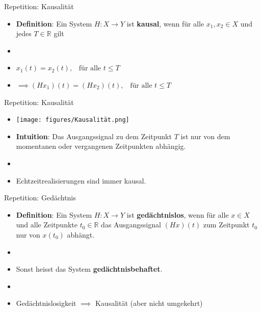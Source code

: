 \documentclass[14pt, aspectratio=169, handout]{beamer}
\begin{document}
\begin{frame}{Repetition: Kausalität}
    \begin{itemize}
        \item \textbf{Definition}: Ein System $H:X \to Y$ ist \textbf{kausal}, wenn für alle $x_1, x_2 \in X$ und jedes $T\in \mathbb{R}$ gilt
        \item[] 
        \item[] $x_1(t) = x_2(t), \hspace{10pt} \text{für alle } t \leq T $
        \item[] \vspace{0.25cm}$\implies (Hx_1)(t) = (Hx_2)(t), \hspace{10pt} \text{für alle } t \leq T$
    \end{itemize}
\end{frame}

\begin{frame}{Repetition: Kausalität}
    \begin{itemize}
        \item[] \begin{center}
        \texttt{[image: figures/Kausalität.png]}
        \end{center}
        \item \textbf{Intuition}: Das Ausgangssignal zu dem Zeitpunkt $T$ ist nur von dem momentanen oder vergangenen Zeitpunkten abhängig.
        \item[] 
        \item Echtzeitrealisierungen sind immer kausal.
    \end{itemize}
\end{frame}

\begin{frame}{Repetition: Gedächtnis}
    \begin{itemize}
        \item \textbf{Definition}: Ein System $H:X \to Y$ ist \textbf{gedächtnislos}, wenn für alle $x\in X$ und alle Zeitpunkte $t_0 \in \mathbb{R}$ das Ausgangssignal $(Hx)(t)$ zum Zeitpunkt $t_0$ nur von $x(t_0)$ abhängt.
        \item[] 
        \item Sonst heisst das System \textbf{gedächtnisbehaftet}.
        \item[] 
        \item Gedächtnislosigkeit $\implies$ Kausalität (aber nicht umgekehrt)
    \end{itemize}
\end{frame}
\end{document}
